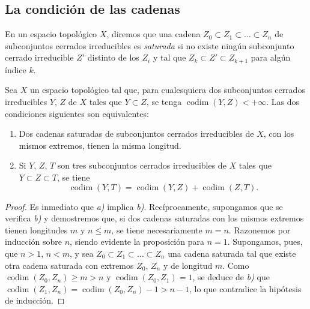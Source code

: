 \subsection{La condición de las cadenas}
\label{subsection:0.14.3-es}

\begin{env}[14.3.1]
\label{0.14.3.1-es}
En un espacio topológico $X$, diremos que una cadena
$Z_0\subset Z_1\subset\ldots\subset Z_n$ de subconjuntos cerrados irreducibles es
\emph{saturada} si no existe ningún subconjunto cerrado irreducible $Z'$ distinto
de los $Z_i$ y tal que $Z_k\subset Z'\subset Z_{k+1}$ para algún índice $k$.
\end{env}

\begin{proposition}[14.3.2]
\label{0.14.3.2-es}
Sea $X$ un espacio topológico tal que, para cualesquiera dos subconjuntos
cerrados irreducibles $Y$, $Z$ de $X$ tales que $Y\subset Z$, se tenga
$\operatorname{codim}(Y,Z)<+\infty$. Las dos condiciones siguientes son
equivalentes:
\begin{enumerate}
  \item[\rm a)] Dos cadenas saturadas de subconjuntos cerrados irreducibles de $X$,
  con los mismos extremos, tienen la misma longitud.
  \item[\rm b)] Si $Y$, $Z$, $T$ son tres subconjuntos cerrados irreducibles de
  $X$ tales que $Y\subset Z\subset T$, se tiene
  \[
    \operatorname{codim}(Y,T)=
    \operatorname{codim}(Y,Z)+\operatorname{codim}(Z,T).
    \tag{14.3.2.1}\label{0.14.3.2.1-es}
  \]
\end{enumerate}
\end{proposition}

\begin{proof}
Es inmediato que \emph{a)} implica \emph{b)}. Recíprocamente, supongamos que se verifica \emph{b)} y
demostremos que, si dos cadenas saturadas con los mismos extremos tienen
longitudes $m$ y $n\leq m$, se tiene necesariamente $m=n$. Razonemos por
inducción sobre $n$, siendo evidente la proposición para $n=1$. Supongamos,
pues, que $n>1$, $n<m$, y sea $Z_0\subset Z_1\subset\ldots\subset Z_n$ una
cadena saturada tal que existe otra cadena saturada con extremos
$Z_0$, $Z_n$ y de longitud $m$. Como
$\operatorname{codim}(Z_0,Z_n)\geq m>n$ y
$\operatorname{codim}(Z_0,Z_1)=1$, se deduce de \emph{b)} que
$\operatorname{codim}(Z_1,Z_n)=\operatorname{codim}(Z_0,Z_n)-1>n-1$, lo que
contradice la hipótesis de inducción.
\end{proof}


